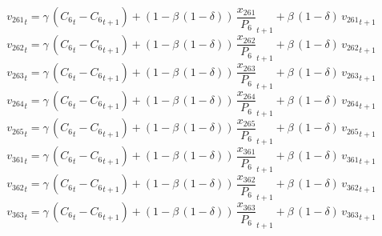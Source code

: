 \begin{dmath}
{{v_{261}}}_{t}={{\gamma}}\, \left({{C_{6}}}_{t}-{{C_{6}}}_{t+1}\right)+\left(1-{{\beta}}\, \left(1-{{\delta}}\right)\right)\, {{\frac{x_{261}}{P_{6}}}}_{t+1}+{{\beta}}\, \left(1-{{\delta}}\right)\, {{v_{261}}}_{t+1}
\end{dmath}
\begin{dmath}
{{v_{262}}}_{t}={{\gamma}}\, \left({{C_{6}}}_{t}-{{C_{6}}}_{t+1}\right)+\left(1-{{\beta}}\, \left(1-{{\delta}}\right)\right)\, {{\frac{x_{262}}{P_{6}}}}_{t+1}+{{\beta}}\, \left(1-{{\delta}}\right)\, {{v_{262}}}_{t+1}
\end{dmath}
\begin{dmath}
{{v_{263}}}_{t}={{\gamma}}\, \left({{C_{6}}}_{t}-{{C_{6}}}_{t+1}\right)+\left(1-{{\beta}}\, \left(1-{{\delta}}\right)\right)\, {{\frac{x_{263}}{P_{6}}}}_{t+1}+{{\beta}}\, \left(1-{{\delta}}\right)\, {{v_{263}}}_{t+1}
\end{dmath}
\begin{dmath}
{{v_{264}}}_{t}={{\gamma}}\, \left({{C_{6}}}_{t}-{{C_{6}}}_{t+1}\right)+\left(1-{{\beta}}\, \left(1-{{\delta}}\right)\right)\, {{\frac{x_{264}}{P_{6}}}}_{t+1}+{{\beta}}\, \left(1-{{\delta}}\right)\, {{v_{264}}}_{t+1}
\end{dmath}
\begin{dmath}
{{v_{265}}}_{t}={{\gamma}}\, \left({{C_{6}}}_{t}-{{C_{6}}}_{t+1}\right)+\left(1-{{\beta}}\, \left(1-{{\delta}}\right)\right)\, {{\frac{x_{265}}{P_{6}}}}_{t+1}+{{\beta}}\, \left(1-{{\delta}}\right)\, {{v_{265}}}_{t+1}
\end{dmath}
\begin{dmath}
{{v_{361}}}_{t}={{\gamma}}\, \left({{C_{6}}}_{t}-{{C_{6}}}_{t+1}\right)+\left(1-{{\beta}}\, \left(1-{{\delta}}\right)\right)\, {{\frac{x_{361}}{P_{6}}}}_{t+1}+{{\beta}}\, \left(1-{{\delta}}\right)\, {{v_{361}}}_{t+1}
\end{dmath}
\begin{dmath}
{{v_{362}}}_{t}={{\gamma}}\, \left({{C_{6}}}_{t}-{{C_{6}}}_{t+1}\right)+\left(1-{{\beta}}\, \left(1-{{\delta}}\right)\right)\, {{\frac{x_{362}}{P_{6}}}}_{t+1}+{{\beta}}\, \left(1-{{\delta}}\right)\, {{v_{362}}}_{t+1}
\end{dmath}
\begin{dmath}
{{v_{363}}}_{t}={{\gamma}}\, \left({{C_{6}}}_{t}-{{C_{6}}}_{t+1}\right)+\left(1-{{\beta}}\, \left(1-{{\delta}}\right)\right)\, {{\frac{x_{363}}{P_{6}}}}_{t+1}+{{\beta}}\, \left(1-{{\delta}}\right)\, {{v_{363}}}_{t+1}
\end{dmath}
